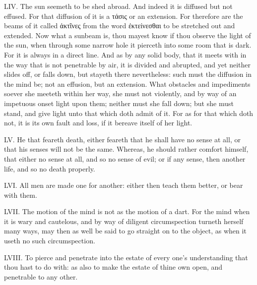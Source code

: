 LIV. The sun seemeth to be shed abroad. And indeed it is diffused but not
effused. For that diffusion of it is a τάσις or
an extension. For therefore are the beams of it called
ἀκτῖνες from the word
ἐκτείνεσθαι to
be stretched out and extended. Now what a sunbeam is, thou mayest know if
thou observe the light of the sun, when through some narrow hole it
pierceth into some room that is dark. For it is always in a direct line.
And as by any solid body, that it meets with in the way that is not
penetrable by air, it is divided and abrupted, and yet neither slides
off, or falls down, but stayeth there nevertheless: such must the
diffusion in the mind be; not an effusion, but an extension. What
obstacles and impediments soever she meeteth within her way, she must not
violently, and by way of an impetuous onset light upon them; neither must
she fall down; but she must stand, and give light unto that which doth
admit of it. For as for that which doth not, it is its own fault and
loss, if it bereave itself of her light.

LV. He that feareth death, either feareth that he shall have no sense at
all, or that his senses will not be the same. Whereas, he should rather
comfort himself, that either no sense at all, and so no sense of evil; or
if any sense, then another life, and so no death properly.

LVI. All men are made one for another: either then teach them better, or
bear with them.

LVII. The motion of the mind is not as the motion of a dart. For
the mind when it is wary and cautelous, and by way of diligent
circumspection turneth herself many ways, may then as well be said to go
straight on to the object, as when it useth no such circumspection.

LVIII. To pierce and penetrate into the estate of every one's
understanding that thou hast to do with: as also to make the estate of
thine own open, and penetrable to any other.


